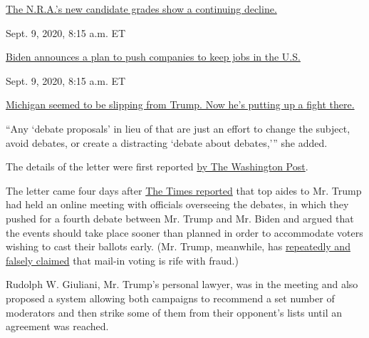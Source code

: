 \href{https://www.nytimes3xbfgragh.onion/live/2020/09/09/us/trump-vs-biden\#the-nras-new-candidate-grades-show-a-continuing-decline}{The
N.R.A.'s new candidate grades show a continuing
decline.}\href{https://www.nytimes3xbfgragh.onion/live/2020/09/09/us/trump-vs-biden\#biden-announces-a-plan-to-push-companies-to-keep-jobs-in-the-us}{}

Sept. 9, 2020, 8:15 a.m. ET

\href{https://www.nytimes3xbfgragh.onion/live/2020/09/09/us/trump-vs-biden\#biden-announces-a-plan-to-push-companies-to-keep-jobs-in-the-us}{Biden
announces a plan to push companies to keep jobs in the
U.S.}\href{https://www.nytimes3xbfgragh.onion/live/2020/09/09/us/trump-vs-biden\#michigan-seemed-to-be-slipping-from-trump-now-hes-putting-up-a-fight-there}{}

Sept. 9, 2020, 8:15 a.m. ET

\href{https://www.nytimes3xbfgragh.onion/live/2020/09/09/us/trump-vs-biden\#michigan-seemed-to-be-slipping-from-trump-now-hes-putting-up-a-fight-there}{Michigan
seemed to be slipping from Trump. Now he's putting up a fight there.}

``Any `debate proposals' in lieu of that are just an effort to change
the subject, avoid debates, or create a distracting `debate about
debates,''' she added.

The details of the letter were first reported
\href{https://www.washingtonpost.com/politics/biden-campaign-confirms-he-will-attend-three-debates-with-trump-criticizes-the-president-for-flipping-on-his-debate-stance/2020/06/22/b48be3a0-b49a-11ea-a510-55bf26485c93_story.html}{by
The Washington Post}.

The letter came four days after
\href{https://www.nytimes3xbfgragh.onion/2020/06/18/us/politics/trump-presidential-debates-2020.html}{The
Times reported} that top aides to Mr. Trump had held an online meeting
with officials overseeing the debates, in which they pushed for a fourth
debate between Mr. Trump and Mr. Biden and argued that the events should
take place sooner than planned in order to accommodate voters wishing to
cast their ballots early. (Mr. Trump, meanwhile, has
\href{https://www.nytimes3xbfgragh.onion/2020/06/02/us/politics/republicans-mail-voting-trump.html}{repeatedly
and falsely claimed} that mail-in voting is rife with fraud.)

Rudolph W. Giuliani, Mr. Trump's personal lawyer, was in the meeting and
also proposed a system allowing both campaigns to recommend a set number
of moderators and then strike some of them from their opponent's lists
until an agreement was reached.

